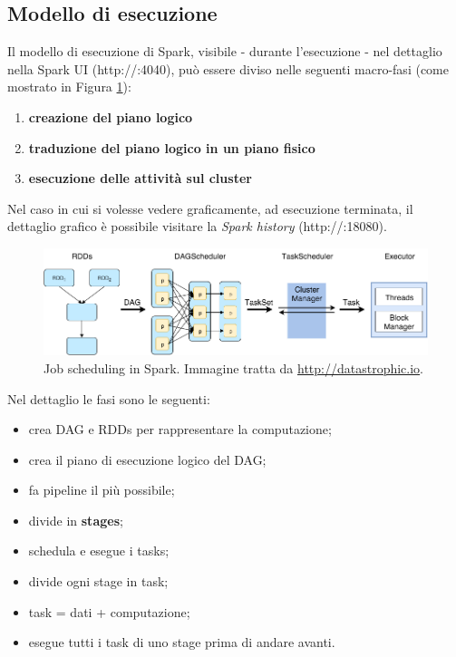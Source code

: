 \documentclass[12pt,italian]{article}
\begin{document}
\subsection{Modello di esecuzione} 
Il modello di esecuzione di Spark, visibile - durante l'esecuzione - nel dettaglio nella Spark UI (http://:4040), può essere diviso nelle seguenti macro-fasi (come mostrato in Figura \ref{fig:model}):
\begin{enumerate}
	\item \textbf{creazione del piano logico}
	\item \textbf{traduzione del piano logico in un piano fisico}
	\item \textbf{esecuzione delle attività sul cluster}
\end{enumerate}
Nel caso in cui si volesse vedere graficamente, ad esecuzione terminata, il dettaglio grafico è possibile visitare la \textit{Spark history} (http://:18080).
\begin{figure}[H]
	\centering 
	\includegraphics[width=1\linewidth]{img/model.png}
	\caption{Job scheduling in Spark. Immagine tratta da \url{http://datastrophic.io}.}
	\label{fig:model}
\end{figure}
Nel dettaglio le fasi sono le seguenti: %
\begin{itemize}
	\item crea DAG e RDDs per rappresentare la computazione;
	\item crea il piano di esecuzione logico del DAG;
	\item fa pipeline il più possibile;
	\item divide in \textbf{stages};
	\item schedula e esegue i tasks;
	\item divide ogni stage in task;
	\item task = dati + computazione;
	\item esegue tutti i task di uno stage prima di andare avanti.
\end{itemize}
\end{document}
